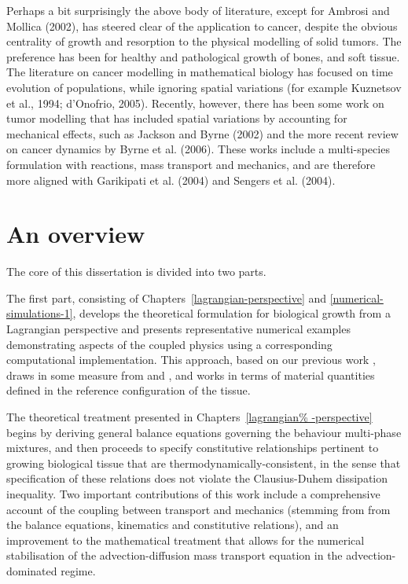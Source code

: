 Perhaps a bit surprisingly the above body of literature, except for
Ambrosi and Mollica (2002), has steered clear of the application to
cancer, despite the obvious centrality of growth and resorption to the
physical modelling of solid tumors. The preference has been for
healthy and pathological growth of bones, and soft tissue. The
literature on cancer modelling in mathematical biology has focused on
time evolution of populations, while ignoring spatial variations (for
example Kuznetsov et al., 1994; d'Onofrio, 2005). Recently, however,
there has been some work on tumor modelling that has included spatial
variations by accounting for mechanical effects, such as Jackson and
Byrne (2002) and the more recent review on cancer dynamics by Byrne et
al. (2006). These works include a multi-species formulation with
reactions, mass transport and mechanics, and are therefore more
aligned with Garikipati et al. (2004) and Sengers et al. (2004).

\section{An overview}
\label{overview}

The core of this dissertation is divided into two parts.

The first part, consisting of Chapters~\ref{lagrangian-perspective}
and \ref{numerical-simulations-1}, develops the theoretical
formulation for biological growth from a Lagrangian perspective and
presents representative numerical examples demonstrating aspects of
the coupled physics using a corresponding computational
implementation. This approach, based on our previous work
\citep{growthpaper}, draws in some measure from
\citet{CowinHegedus:76, EpsteinMaugin:2000} and
\citet{TaberHumphrey:2001}, and works in terms of material quantities
defined in the reference configuration of the tissue.

The theoretical treatment presented in Chapters~\ref{lagrangian%
  -perspective} begins by deriving general balance equations governing
the behaviour multi-phase mixtures, and then proceeds to specify
constitutive relationships pertinent to growing biological tissue that
are thermody\-namically-consistent, in the sense that specification of
these relations does not violate the Clausius-Duhem dissipation
inequality. Two important contributions of this work include a
comprehensive account of the coupling between transport and mechanics
(stemming from from the balance equations, kinematics and constitutive
relations), and an improvement to the mathematical treatment that
allows for the numerical stabilisation of the advection-diffusion mass
transport equation in the advection-dominated regime.

